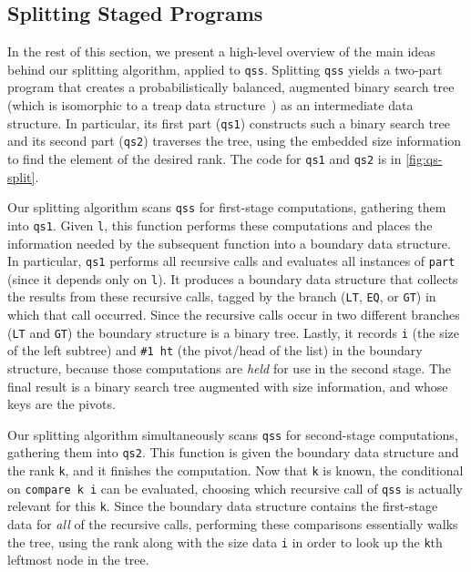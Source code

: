 \begin{abstrsyn}
\subsection{Splitting Staged Programs}



In the rest of this section, we present a high-level overview of the main ideas
behind our splitting algorithm, applied to \texttt{qss}.
%
Splitting \texttt{qss} yields a two-part program that creates a
probabilistically balanced, augmented binary search tree (which is isomorphic to
a treap data structure~\cite{SeidelAr96}) as an intermediate data structure. In
particular, its first part (\texttt{qs1}) constructs such a binary search tree
and its second part (\texttt{qs2}) traverses the tree, using the embedded size
information to find the element of the desired rank.
%
The code for \texttt{qs1} and \texttt{qs2} is in \ref{fig:qs-split}.


Our splitting algorithm scans \texttt{qss} for first-stage computations,
gathering them into \texttt{qs1}. Given \texttt{l}, this function performs these
computations and places the information needed by the subsequent function into a
boundary data structure.
%
In particular, \texttt{qs1} performs all recursive calls and evaluates all
instances of \texttt{part} (since it depends only on \texttt{l}). It
produces a boundary data structure that collects the results from these
recursive calls, tagged by the branch (\texttt{LT}, \texttt{EQ}, or \texttt{GT})
in which that call occurred. Since the recursive calls occur in two different
branches (\texttt{LT} and \texttt{GT}) the boundary structure is a binary tree.  
%
Lastly, it records \texttt{i} (the size of the left subtree) and \texttt{\#1 ht}
(the pivot/head of the list) in the boundary structure, because those
computations are \emph{held} for use in the second stage.
%
The final result is a binary search tree augmented with size information, and
whose keys are the pivots.

Our splitting algorithm simultaneously scans \texttt{qss} for second-stage
computations, gathering them into \texttt{qs2}. This function is given the boundary
data structure and the rank \texttt{k}, and it finishes the computation. Now that
\texttt{k} is known, the conditional on \texttt{compare k i} can be evaluated,
choosing which recursive call of \texttt{qss} is actually relevant for this
\texttt{k}. Since the boundary data structure contains the first-stage data for
\emph{all} of the recursive calls, performing these comparisons essentially
walks the tree, using the rank along with the size data \texttt{i} in order to
look up the \texttt{k}th leftmost node in the tree.


\end{abstrsyn}
